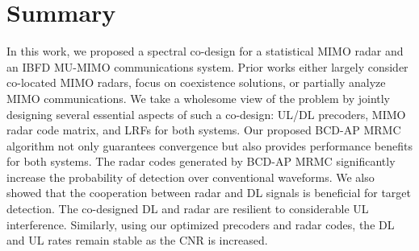\documentclass[9pt,journal]{IEEEtran}
\theoremstyle{definition}
\begin{document}
{\section{Summary}
\label{sec:conclusion}
In this work, we proposed a spectral co-design for a statistical MIMO radar and an IBFD MU-MIMO communications system. Prior works either largely consider co-located MIMO radars, focus on coexistence solutions, or partially analyze MIMO communications. We take a wholesome view of the problem by jointly designing several essential aspects of such a co-design:  UL/DL precoders, MIMO radar code matrix, and LRFs for both systems. Our proposed BCD-AP MRMC algorithm not only guarantees convergence but also provides performance benefits for both systems. %
The radar codes generated by BCD-AP MRMC significantly increase the probability of detection over conventional waveforms. We also showed that the cooperation between radar and DL signals is beneficial for target detection. The co-designed DL and radar are resilient to considerable UL interference. Similarly, using our optimized precoders and radar codes, the DL and UL rates remain stable as the CNR is increased. %
	
}
\end{document}
